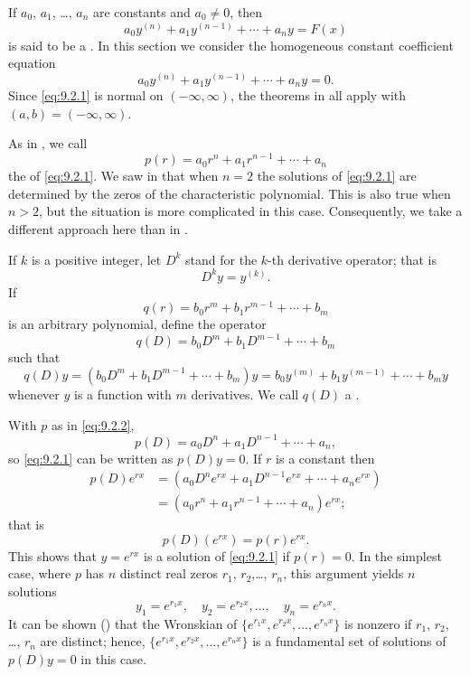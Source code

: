 If $a_0$, $a_1$, \dots, $a_n$ are constants and $a_0\ne0$, then
\[
a_0y^{(n)}+a_1y^{(n-1)}+\cdots+a_ny=F(x)
\]
is said to be a .
In this section we consider the homogeneous constant coefficient
equation
\begin{equation} \label{eq:9.2.1}
a_0y^{(n)}+a_1y^{(n-1)}+\cdots+a_ny=0.
\end{equation}
Since \eqref{eq:9.2.1} is normal on $(-\infty,\infty)$, the theorems in
 all apply with $(a,b)=(-\infty,\infty)$.

As in , we call
\begin{equation} \label{eq:9.2.2}
p(r)=a_0r^n+a_1r^{n-1}+\cdots+a_n
\end{equation}
the
of \eqref{eq:9.2.1}. We saw in
 that when $n=2$ the solutions of \eqref{eq:9.2.1} are
determined by the zeros of the characteristic polynomial. This is also
true when $n>2$, but the situation is more complicated in this case.
Consequently, we take a different approach here than in
.

If $k$ is a positive integer, let $D^k$ stand
for the $k$-th derivative operator;   that is
\[
D^ky=y^{(k)}.
\]
If
\[
q(r)=b_0r^m+b_1r^{m-1}+\cdots+b_m
\]
is an arbitrary polynomial,  define the operator
\[
q(D)=b_0D^m+b_1D^{m-1}+\cdots+b_m
\]
such that
\[
q(D)y=(b_0D^m+b_1D^{m-1}+\cdots+b_m)y=b_0y^{(m)}+b_1y^{(m-1)}+\cdots+
b_my
\]
whenever $y$ is a function with $m$ derivatives. We call $q(D)$
a .

With $p$ as in \eqref{eq:9.2.2},
\[
p(D)=a_0D^n+a_1D^{n-1}+\cdots+a_n,
\]
so \eqref{eq:9.2.1} can be written as $p(D)y=0$.  If $r$ is a constant
then
\begin{align*}
p(D)e^{rx}&=\left(a_0D^ne^{rx}+a_1D^{n-1}e^{rx}+\cdots+a_ne^{rx}\right)\\
&=(a_0r^n+a_1r^{n-1}+\cdots+a_n)e^{rx};
\end{align*}
that is
\[
p(D)(e^{rx})=p(r)e^{rx}.
\]
This shows that $y=e^{rx}$ is a solution of \eqref{eq:9.2.1}
if $p(r)=0$.
In the simplest case, where $p$ has $n$ distinct real zeros
$r_1$, $r_2$,\dots, $r_n$, this argument yields $n$ solutions
\[
y_1=e^{r_1x},\quad y_2=e^{r_2x},\dots,\quad y_n=e^{r_nx}.
\]
It can be shown () that the Wronskian of
$\{e^{r_1x},e^{r_2x},\dots,e^{r_nx}\}$ is nonzero if
$r_1$, $r_2$, \dots, $r_n$ are distinct; hence,
$\{e^{r_1x},e^{r_2x},\dots,e^{r_nx}\}$
is a fundamental set of solutions of $p(D)y=0$ in this case.

